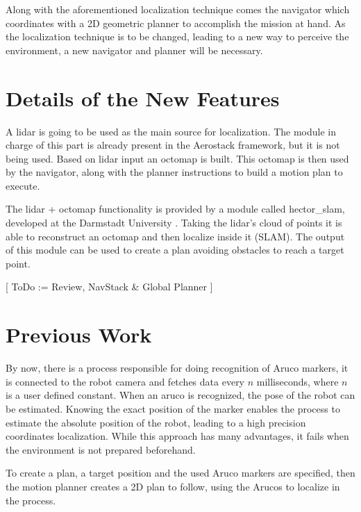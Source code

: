     Along with the aforementioned localization technique comes the navigator which coordinates with a 2D geometric planner to accomplish the mission at hand. As the localization technique is to be changed, leading to a new way to perceive the environment, a new navigator and planner will be necessary. 

  \section{Details of the New Features} \label{ch_2:sect:improvements}

    A lidar is going to be used as the main source for localization. The module in charge of this part is already present in the Aerostack framework, but it is not being used. Based on lidar input an octomap is built. This octomap is then used by the navigator, along with the planner instructions to build a motion plan to execute.

    The lidar + octomap functionality is provided by a module called hector\_slam, developed at the Darmstadt University \cite{hector_slam}. Taking the lidar's cloud of points it is able to reconstruct an octomap and then localize inside it (SLAM). The output of this module can be used to create a plan avoiding obstacles to reach a target point.

    [ ToDo := Review, NavStack \& Global Planner ]

  \section{Previous Work} \label{ch_2:sect:previous_work}

    By now, there is a process responsible for doing recognition of Aruco markers, it is connected to the robot camera and fetches data every $n$ milliseconds, where $n$ is a user defined constant. When an aruco is recognized, the pose of the robot can be estimated. Knowing the exact position of the marker enables the process to estimate the absolute position of the robot, leading to a high precision coordinates localization. While this approach has many advantages, it fails when the environment is not prepared beforehand.

    To create a plan, a target position and the used Aruco markers are specified, then the motion planner creates a 2D plan to follow, using the Arucos to localize in the process.

    \begin{comment}
      \begin{itemize}
      \end{itemize}
    \end{comment}

